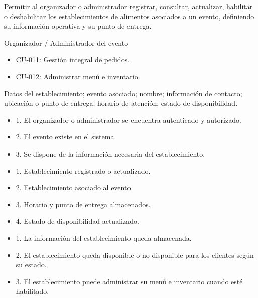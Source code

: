 \begin{description}[leftmargin=!, labelwidth=3.4cm, style=nextline, topsep=3pt]
\item[Objetivo] Permitir al organizador o administrador registrar, consultar, actualizar, habilitar o deshabilitar los establecimientos de alimentos asociados a un evento, definiendo su información operativa y su punto de entrega.

\item[Actores] Organizador / Administrador del evento

\item[CU relacionados] \hfill
\begin{itemize}[leftmargin=1.2em, topsep=1pt]
  \item CU-011: Gestión integral de pedidos.
  \item CU-012: Administrar menú e inventario.
\end{itemize}

\item[Entradas] Datos del establecimiento; evento asociado; nombre; información de contacto; ubicación o punto de entrega; horario de atención; estado de disponibilidad.

\item[Pre-condiciones] \hfill
\begin{itemize}[leftmargin=1.2em, topsep=1pt]
  \item 1. El organizador o administrador se encuentra autenticado y autorizado.
  \item 2. El evento existe en el sistema.
  \item 3. Se dispone de la información necesaria del establecimiento.
\end{itemize}

\item[Salidas] \hfill
\begin{itemize}[leftmargin=1.2em, topsep=1pt]
  \item 1. Establecimiento registrado o actualizado.
  \item 2. Establecimiento asociado al evento.
  \item 3. Horario y punto de entrega almacenados.
  \item 4. Estado de disponibilidad actualizado.
\end{itemize}

\item[Post-condiciones] \hfill
\begin{itemize}[leftmargin=1.2em, topsep=1pt]
  \item 1. La información del establecimiento queda almacenada.
  \item 2. El establecimiento queda disponible o no disponible para los clientes según su estado.
  \item 3. El establecimiento puede administrar su menú e inventario cuando esté habilitado.
\end{itemize}

\end{description}

